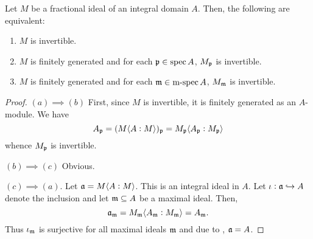 \begin{proposition}
    Let $M$ be a fractional ideal of an integral domain $A$. Then, the following are equivalent: 
    \begin{enumerate}[label=(\alph*)]
        \item $M$ is invertible. 
        \item $M$ is finitely generated and for each $\mathfrak p\in\operatorname{spec} A$, $M_\mathfrak p$ is invertible. 
        \item $M$ is finitely generated and for each $\mathfrak m\in\operatorname{m-spec} A$, $M_\mathfrak m$ is invertible. 
    \end{enumerate}
\end{proposition}
\begin{proof}
    $(a)\implies(b)$ First, since $M$ is invertible, it is finitely generated as an $A$-module. We have 
    \begin{equation*}
        A_\mathfrak p = (M\langle A:M\rangle)_\mathfrak p = M_\mathfrak p\langle A_\mathfrak p:M_\mathfrak p\rangle
    \end{equation*}
    whence $M_\mathfrak p$ is invertible.

    $(b)\implies(c)$ Obvious. 

    $(c)\implies(a)$. Let $\mathfrak a = M\langle A:M\rangle$. This is an integral ideal in $A$. Let $\iota:\mathfrak a\hookrightarrow A$ denote the inclusion and let $\mathfrak m\subseteq A$ be a maximal ideal. Then, 
    \begin{equation*}
        \mathfrak a_\mathfrak m = M_\mathfrak m\langle A_\mathfrak m:M_\mathfrak m\rangle = A_\mathfrak m.
    \end{equation*}
    Thus $\iota_\mathfrak m$ is surjective for all maximal ideals $\mathfrak m$ and due to , $\mathfrak a = A$.
\end{proof}

